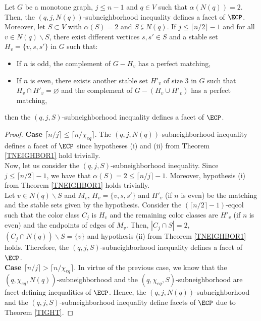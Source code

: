 \begin{tcor} \label{T2RANK2CASEQ1}
Let $G$ be a monotone graph, $j \leq n - 1$ and $q \in V$ such that $\alpha(N(q)) = 2$. Then, the $(q,j,N(q))$-subneighborhood inequality defines a facet of $\ECP$.\\
Moreover, let $S \subset V$ with $\alpha(S) = 2$ and $S \subsetneqq N(q)$.
If $j \leq \lceil n/2 \rceil - 1$ and
for all $v \in N(q) \backslash S$, there exist different vertices $s, s' \in S$
and a stable set $H_v = \{v, s, s'\}$ in $G$ such that:
\begin{itemize}
\item If $n$ is odd, the complement of $G - H_v$ has a perfect matching,
\item If $n$ is even, there exists another stable set $H'_v$ of size 3 in $G$ such that $H_v \cap H'_v = \varnothing$
and the complement of $G - (H_v \cup H'_v)$ has a perfect matching,
\end{itemize}
then the $(q,j,S)$-subneighborhood inequality defines a facet of $\ECP$.
\end{tcor}
\begin{proof}
\textbf{Case $\lceil n/j \rceil \leq \lceil n/\chi_{eq} \rceil$}. The $(q,j,N(q))$-subneighborhood inequality defines
a facet of $\ECP$ since hypotheses (i) and (ii) from Theorem \ref{TNEIGHBOR1} hold trivially.\\
Now, let us consider the $(q,j,S)$-subneighborhood inequality. Since $j \leq \lceil n/2 \rceil - 1$, we have that
$\alpha(S) = 2 \leq \lceil n/j \rceil - 1$. Moreover, hypothesis (i) from Theorem \ref{TNEIGHBOR1}
holds trivially.\\
Let $v \in N(q) \backslash S$ and $M_v$, $H_v = \{v, s, s'\}$ and $H'_v$ (if $n$ is even) be the matching and the stable sets given by the hypothesis. Consider the $(\lceil n/2 \rceil - 1)$-eqcol such that the
color class $C_j$ is $H_v$ and the remaining color classes are $H'_v$ (if $n$ is even) and the endpoints of edges of $M_v$. Then, $|C_j \cap S| = 2$, $(C_j \cap N(q)) \backslash S = \{v\}$ and hypothesis (ii) from Theorem \ref{TNEIGHBOR1} holds. Therefore, the $(q,j,S)$-subneighborhood inequality defines a facet of $\ECP$.\\
\textbf{Case $\lceil n/j \rceil > \lceil n/\chi_{eq} \rceil$}. In virtue of the previous case, we know that the
$(q,\chi_{eq},N(q))$-subneighborhood and the $(q,\chi_{eq},S)$-subneighborhood are facet-defining inequalities of
$\ECP$. Hence, the $(q,j,N(q))$-subneighborhood and the $(q,j,S)$-subneighborhood inequality define facets of $\ECP$ due to Theorem \ref{TIGHT}.
\end{proof}

